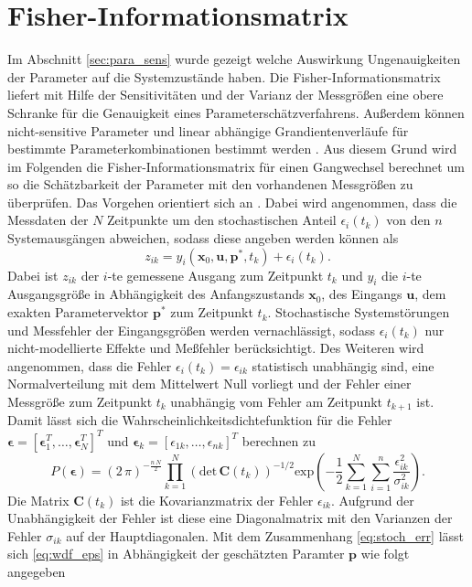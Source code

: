 \section{Fisher-Informationsmatrix}\label{sec:FiIn}
Im Abschnitt \ref{sec:para_sens} wurde gezeigt welche Auswirkung Ungenauigkeiten der Parameter auf die Systemzustände haben. Die Fisher-Informationsmatrix liefert mit Hilfe der Sensitivitäten und der Varianz der Messgrößen eine obere Schranke für die Genauigkeit eines Parameterschätzverfahrens. Außerdem können nicht-sensitive Parameter und linear abhängige Grandientenverläufe für bestimmte Parameterkombinationen bestimmt werden \cite{Majer.1998}. Aus diesem Grund wird im Folgenden die Fisher-Informationsmatrix für einen Gangwechsel berechnet um so die Schätzbarkeit der Parameter mit den vorhandenen Messgrößen zu überprüfen. Das Vorgehen orientiert sich an \cite{Majer.1998}. Dabei wird angenommen, dass die Messdaten der $N$ Zeitpunkte um den stochastischen Anteil $\epsilon_i(t_k)$ von den $n$ Systemausgängen abweichen, sodass diese angeben werden können als
\begin{equation}\label{eq:stoch_err}
z_{ik} = y_i(\pmb{x}_0,\pmb{u},\pmb{p}^*,t_k) + \epsilon_i(t_k).
\end{equation}
Dabei ist $z_{ik}$ der $i$-te gemessene Ausgang zum Zeitpunkt $t_k$ und $y_i$ die $i$-te Ausgangsgröße in Abhängigkeit des Anfangszustands $\pmb{x}_0$, des Eingangs $\pmb{u}$, dem exakten Parametervektor $\pmb{p}^*$ zum Zeitpunkt $t_k$. Stochastische Systemstörungen und Messfehler der Eingangsgrößen werden vernachlässigt, sodass $\epsilon_i(t_k)$ nur nicht-modellierte Effekte und Meßfehler berücksichtigt. Des Weiteren wird angenommen, dass die Fehler  $\epsilon_i(t_k) = \epsilon_{ik}$ statistisch unabhängig sind, eine Normalverteilung mit dem Mittelwert Null vorliegt und der Fehler einer Messgröße zum Zeitpunkt $t_k$ unabhängig vom Fehler am Zeitpunkt $t_{k+1}$ ist. Damit lässt sich die Wahrscheinlichkeitsdichtefunktion für die Fehler $\pmb{\epsilon} = [\pmb{\epsilon}_1^T,\dots,\pmb{\epsilon}_N^T]^T$ und $\pmb{\epsilon}_k = [\epsilon_{1k},\dots,\epsilon_{nk}]^T$ berechnen zu
\begin{equation}\label{eq:wdf_eps}
P(\pmb{\epsilon}) = (2\, \pi)^{-\frac{n\,N}{2}}\prod^N_{k=1}\left(\mathrm{det}\,\pmb{C}(t_k)\right)^{-1/2}\mathrm{exp}\left(-\frac{1}{2}\sum^N_{k=1}\sum^n_{i=1}\frac{\epsilon^2_{ik}}{\sigma^2_{ik}}\right).
\end{equation}
Die Matrix $\pmb{C}(t_k)$ ist die Kovarianzmatrix der Fehler $\epsilon_{ik}$. Aufgrund der Unabhängigkeit der Fehler ist diese eine Diagonalmatrix mit den Varianzen der Fehler $\sigma_{ik}$ auf der Hauptdiagonalen. Mit dem Zusammenhang \eqref{eq:stoch_err} lässt sich \eqref{eq:wdf_eps} in Abhängigkeit der geschätzten Paramter $\pmb{p}$ wie folgt angegeben
